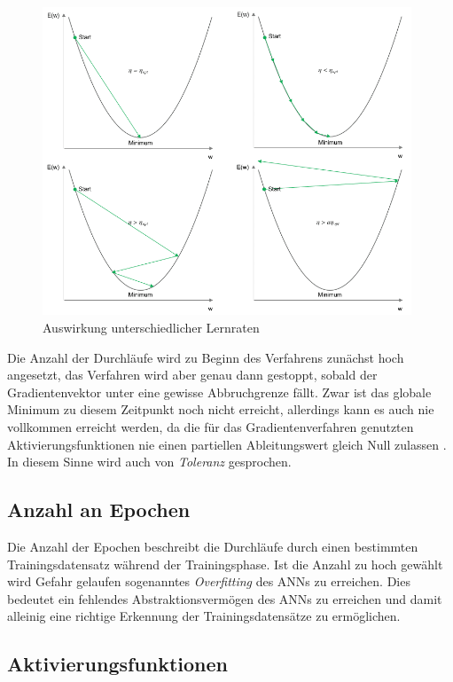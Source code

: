 \begin{figure}[ht]
	\begin{center}
		\includegraphics[width=11cm]{Bilder/learning_rate.png} 
		\caption[Auswirkung unterschiedlicher Lernraten]{Auswirkung unterschiedlicher Lernraten \cite{SebastianHeinz.2018}}
		\label{learning_rate}
	\end{center}
\end{figure}

Die Anzahl der Durchläufe wird zu Beginn des Verfahrens zunächst hoch angesetzt, das Verfahren wird aber genau dann gestoppt, sobald der Gradientenvektor unter eine gewisse Abbruchgrenze fällt. Zwar ist das globale Minimum zu diesem Zeitpunkt noch nicht erreicht, allerdings kann es auch nie vollkommen erreicht werden, da die für das Gradientenverfahren genutzten Aktivierungsfunktionen nie einen partiellen Ableitungswert gleich Null zulassen \cite[S. 118, S. 272]{AurelienGeron.2018}. In diesem Sinne wird auch von \textit{Toleranz} gesprochen.

\subsection*{Anzahl an Epochen}

Die Anzahl der Epochen beschreibt die Durchläufe durch einen bestimmten Trainingsdatensatz während der Trainingsphase. Ist die Anzahl zu hoch gewählt wird Gefahr gelaufen sogenanntes \textit{Overfitting} des ANNs zu erreichen. Dies bedeutet ein fehlendes Abstraktionsvermögen des ANNs zu erreichen und damit alleinig eine richtige Erkennung der Trainingsdatensätze zu ermöglichen.  

\subsection*{Aktivierungsfunktionen}

